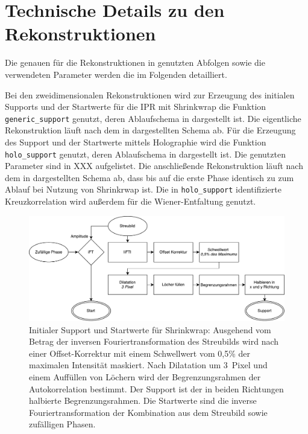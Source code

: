 \chapter{Technische Details zu den Rekonstruktionen}
Die genauen für die Rekonstruktionen in  genutzten Abfolgen sowie die verwendeten Parameter werden die im Folgenden detailliert.

Bei den zweidimensionalen Rekonstruktionen wird zur Erzeugung des initialen Supports und der Startwerte für die IPR mit Shrinkwrap die Funktion \texttt{generic\_support} genutzt, deren Ablaufschema in  dargestellt ist. Die eigentliche Rekonstruktion läuft nach dem in  dargestellten Schema ab.
Für die Erzeugung des Support und der Startwerte mittels Holographie wird die Funktion \texttt{holo\_support} genutzt, deren Ablaufschema in  dargestellt ist. Die genutzten Parameter sind in XXX aufgelistet. Die anschließende Rekonstruktion läuft nach dem in  dargestellten Schema ab, dass bis auf die erste Phase identisch zu zum Ablauf bei Nutzung von Shrinkrwap ist.
Die in \texttt{holo\_support} identifizierte Kreuzkorrelation wird außerdem für die Wiener-Entfaltung genutzt.

\begin{figure}
	\centering
	\includegraphics[width=.85\textwidth]{images/flow_genericsupport.pdf}

		\caption[Initialer Support für Shrinkwrap]{Initialer Support und Startwerte für Shrinkwrap: Ausgehend vom Betrag der inversen Fouriertransformation des Streubilds wird nach einer Offset-Korrektur mit einem Schwellwert vom 0,5\% der maximalen Intensität maskiert. Nach Dilatation um \SI{3}{Pixel} und einem Auffüllen von Löchern wird der Begrenzungsrahmen der Autokorrelation bestimmt. Der Support ist der in beiden Richtungen halbierte Begrenzungsrahmen. Die Startwerte sind die inverse Fouriertransformation der Kombination aus dem Streubild sowie zufälligen Phasen.}
	\label{fig:flow_genericsupport}
\end{figure} 

